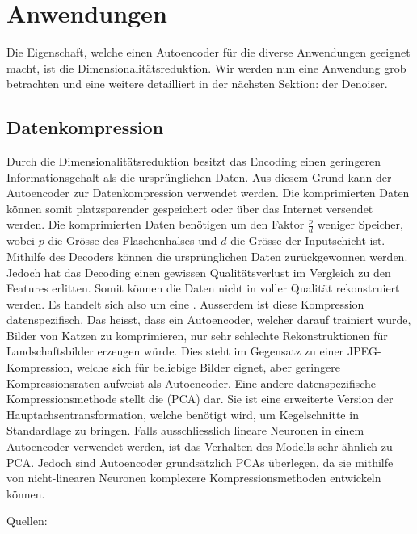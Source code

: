\section{Anwendungen}
Die Eigenschaft, welche einen Autoencoder für die diverse
Anwendungen geeignet macht, ist die Dimensionalitätsreduktion.
Wir werden nun eine Anwendung grob betrachten und eine weitere detailliert
in der nächsten Sektion: der Denoiser.

\subsection{Datenkompression}
Durch die Dimensionalitätsreduktion besitzt das Encoding einen geringeren
Informationsgehalt als die ursprünglichen Daten. Aus diesem Grund kann der
Autoencoder zur Datenkompression verwendet werden. Die komprimierten Daten
können somit platzsparender gespeichert oder über das Internet versendet werden.
Die komprimierten Daten benötigen um den Faktor $\frac{p}{d}$ weniger Speicher,
wobei $p$ die Grösse des Flaschenhalses und $d$ die Grösse
der Inputschicht ist.
Mithilfe des Decoders können die ursprünglichen Daten zurückgewonnen werden.
Jedoch hat das Decoding einen gewissen Qualitätsverlust im Vergleich zu den
Features erlitten. Somit können die Daten nicht in voller Qualität rekonstruiert
werden. Es handelt sich also um eine .
Ausserdem ist diese Kompression datenspezifisch. Das heisst, dass ein
Autoencoder, welcher darauf trainiert wurde, Bilder von Katzen zu komprimieren,
nur sehr schlechte Rekonstruktionen für Landschaftsbilder erzeugen würde. Dies
steht im Gegensatz zu einer JPEG-Kompression, welche sich für beliebige
Bilder eignet, aber geringere Kompressionsraten aufweist als Autoencoder.
\para{}
Eine andere datenspezifische Kompressionsmethode stellt die
 (PCA) dar. Sie ist eine erweiterte Version der
Hauptachsentransformation, welche benötigt wird, um Kegelschnitte in
Standardlage zu bringen. Falls ausschliesslich lineare Neuronen in einem
Autoencoder verwendet werden, ist das Verhalten des Modells sehr ähnlich zu PCA.
Jedoch sind Autoencoder grundsätzlich PCAs überlegen, da sie mithilfe von
nicht-linearen Neuronen komplexere Kompressionsmethoden entwickeln können.

\para{}
Quellen: \cite{paper:autoencoder_compression}


